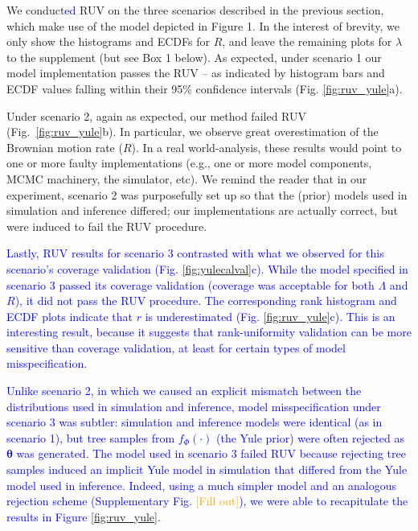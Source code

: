 \documentclass[oneside]{article}
\begin{document}
We conduct\textcolor{blue}{ed} RUV on the three scenarios described in the previous section, which make use of the model depicted in Figure 1.
In the interest of brevity, we only show the histograms and ECDFs for $R$, and leave the remaining plots for $\lambda$ to the supplement (but see Box 1 below).
As expected, under scenario 1 our model implementation passes the RUV -- as indicated by histogram bars and ECDF values falling within their 95\% confidence intervals (Fig. \ref{fig:ruv_yule}a).

Under scenario 2, again as expected, our method failed RUV (Fig.~\ref{fig:ruv_yule}b).
In particular, we observe great overestimation of the Brownian motion rate ($R$).
In a real world-analysis, these results would point to one or more faulty implementations (e.g., one or more model components, MCMC machinery, the simulator, etc).
We remind the reader that in our experiment, scenario 2 was purposefully set up so that the (prior) models used in simulation and inference differed; our implementations are actually correct, but were induced to fail the RUV procedure.

\textcolor{blue}{Lastly, RUV results for scenario 3 contrasted with what we observed for this scenario's coverage validation (Fig. \ref{fig:yulecalval}c).
  While the model specified in scenario 3 passed its coverage validation (coverage was acceptable for both $\Lambda$ and $R$), it did not pass the RUV procedure.
  The corresponding rank histogram and ECDF plots indicate that $r$ is underestimated (Fig. \ref{fig:ruv_yule}c).
  This is an interesting result, because it suggests that rank-uniformity validation can be more sensitive than coverage validation, at least for certain types of model misspecification.
}

\textcolor{blue}{
  Unlike scenario 2, in which we caused an explicit mismatch between the distributions used in simulation and inference, model misspecification under scenario 3 was subtler: simulation and inference models were identical (as in scenario 1), but tree samples from $f_\Phi(\cdot)$ (the Yule prior) were often rejected as $\boldsymbol{\theta}$ was generated.
  The model used in scenario 3 failed RUV because rejecting tree samples induced an implicit Yule model in simulation that differed from the Yule model used in inference. 
  Indeed, using a much simpler model and an analogous rejection scheme (Supplementary Fig. \textcolor{orange}{[Fill out]}), we were able to recapitulate the results in Figure \ref{fig:ruv_yule}.
}
\end{document}
